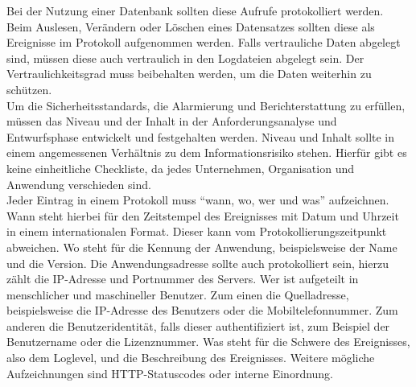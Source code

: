 Bei der Nutzung einer Datenbank sollten diese Aufrufe protokolliert werden.
Beim Auslesen, Verändern oder Löschen eines Datensatzes sollten diese als Ereignisse im Protokoll aufgenommen werden.
Falls vertrauliche Daten abgelegt sind, müssen diese auch vertraulich in den Logdateien abgelegt sein.
Der Vertraulichkeitsgrad muss beibehalten werden, um die Daten weiterhin zu schützen.
\\
Um die Sicherheitsstandards, die Alarmierung und Berichterstattung zu erfüllen, müssen das Niveau und der Inhalt in der Anforderungsanalyse und Entwurfsphase entwickelt und festgehalten werden.
Niveau und Inhalt sollte in einem angemessenen Verhältnis zu dem Informationsrisiko stehen.
Hierfür gibt es keine einheitliche Checkliste, da jedes Unternehmen, Organisation und Anwendung verschieden sind.
\\
Jeder Eintrag in einem Protokoll muss \enquote{wann, wo, wer und was} aufzeichnen.
Wann steht hierbei für den Zeitstempel des Ereignisses mit Datum und Uhrzeit in einem internationalen Format.
Dieser kann vom Protokollierungszeitpunkt abweichen.
Wo steht für die Kennung der Anwendung, beispielsweise der Name und die Version.
Die Anwendungsadresse sollte auch protokolliert sein, hierzu zählt die IP-Adresse und Portnummer des Servers.
Wer ist aufgeteilt in menschlicher und maschineller Benutzer.
Zum einen die Quelladresse, beispielsweise die IP-Adresse des Benutzers oder die Mobiltelefonnummer.
Zum anderen die Benutzeridentität, falls dieser authentifiziert ist, zum Beispiel der Benutzername oder die Lizenznummer.
Was steht für die Schwere des Ereignisses, also dem Loglevel, und die Beschreibung des Ereignisses.
Weitere mögliche Aufzeichnungen sind HTTP-Statuscodes oder interne Einordnung.
\\

